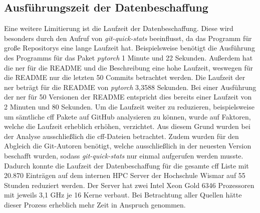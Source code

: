 \subsection*{Ausführungszeit der Datenbeschaffung}
\label{sec:ausfuehrungszeit_der_datenbeschaffung}
Eine weitere Limitierung ist die Laufzeit der Datenbeschaffung.
Diese wird besonders durch den Aufruf von \emph{git-quick-stats} beeinflusst, da das Programm für große Repositorys eine lange Laufzeit hat.
Beispielsweise benötigt die Ausführung des Programms für das Paket \emph{pytorch} 1 Minute und 22 Sekunden.
Außerdem hat die \gls{ner} für die README und die Beschreibung eine hohe Laufzeit, weswegen für die README nur die letzten 50 Commits betrachtet werden.
Die Laufzeit der \gls{ner} beträgt für die README von \emph{pytorch} 3,3588 Sekunden.
Bei einer Ausführung der \gls{ner} für 50 Versionen der README entspricht dies bereits einer Laufzeit von 2 Minuten und 80 Sekunden.
Um die Laufzeit weiter zu reduzieren, beispielsweise um sämtliche \gls{cff} Pakete auf GitHub analysieren zu können, wurde auf Faktoren, welche die Laufzeit erheblich erhöhen, verzichtet.
Aus diesem Grund wurden bei der Analyse ausschließlich die \gls{cff}-Dateien betrachtet.
Zudem wurden für den Abgleich die Git-Autoren benötigt, welche ausschließlich in der neuesten Version beschafft wurden, sodass \emph{git-quick-stats} nur einmal aufgerufen werden musste.
Dadurch konnte die Laufzeit der Datenbeschaffung für die gesamte \gls{cff} Liste mit 20.870 Einträgen auf dem internen HPC Server der Hochschule Wismar auf 55 Stunden reduziert werden.
Der Server hat zwei Intel Xeon Gold 6346 Prozessoren mit jeweils 3,1 GHz je 16 Kerne verbaut.
Bei Betrachtung aller Quellen hätte dieser Prozess erheblich mehr Zeit in Anspruch genommen.

